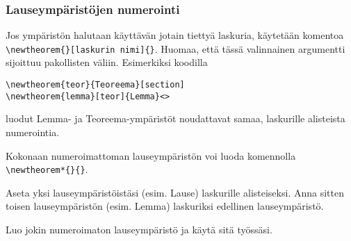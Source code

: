 \begin{fframe}
    \frametitle{Lauseympäristöjen numerointi}
    Jos ympäristön halutaan käyttävän jotain tiettyä laskuria, käytetään komentoa \lstinline-\newtheorem{}[laskurin nimi]{}-. Huomaa, että tässä valinnainen argumentti sijoittuu pakollisten väliin. 
    \vaihto
    Esimerkiksi koodilla
    \begin{lstlisting}
\newtheorem{teor}{Teoreema}[section]
\newtheorem{lemma}[teor]{Lemma}<>
    \end{lstlisting}
    luodut Lemma- ja Teoreema-ympäristöt noudattavat samaa, laskurille  alisteista numerointia.
\end{fframe}

\begin{fframe}
    Kokonaan numeroimattoman lauseympäristön voi luoda komennolla \lstinline-\newtheorem*{}{}-.
    \begin{harj}
        Aseta yksi lauseympäristöistäsi (esim. Lause) laskurille  alisteiseksi.
        Anna sitten toisen lauseympäristön (esim. Lemma) laskuriksi edellinen lauseympäristö. 
    \end{harj}
    \begin{harj}
        Luo jokin numeroimaton lauseympäristö ja käytä sitä työssäsi.
    \end{harj}
\end{fframe}


